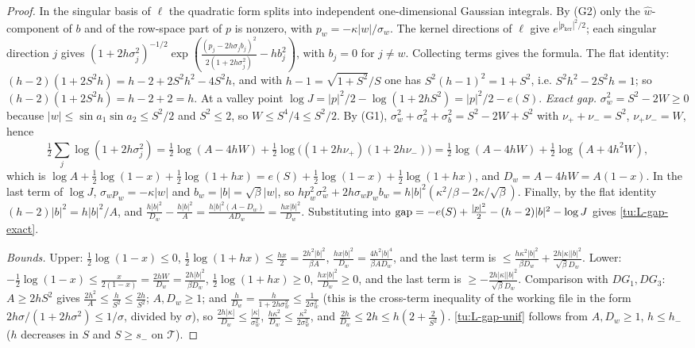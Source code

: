 \begin{proof}
In the singular basis of $\ell$ the quadratic form splits into independent one-dimensional Gaussian
integrals. By (G2) only the $\hat w$-component of $b$ and of the row-space part of $p$ is nonzero, with
$p_w=-\kappa|w|/\sigma_w$. The kernel directions of $\ell$ give $e^{|p_{\ker}|^2/2}$; each singular direction
$j$ gives $(1+2h\sigma_j^2)^{-1/2}\exp(\frac{(p_j-2h\sigma_jb_j)^2}{2(1+2h\sigma_j^2)}-hb_j^2)$, with $b_j=0$ for $j\ne w$.
Collecting terms gives the formula. The flat identity:
$(h-2)(1+2S^2h)=h-2+2S^2h^2-4S^2h$, and with $h-1=\sqrt{1+S^2}/S$ one has $S^2(h-1)^2=1+S^2$, i.e.
$S^2h^2-2S^2h=1$; so $(h-2)(1+2S^2h)=h-2+2=h$. At a valley point $\log J=|p|^2/2-\log(1+2hS^2)=|p|^2/2-e(S)$.
\emph{Exact gap.} $\sigma_w^2=S^2-2W\ge0$ because $|w|\le\sin a_1\sin a_2\le S^2/2$ and $S^2\le2$, so $W\le S^4/4\le S^2/2$.
By (G1), $\sigma_w^2+\sigma_a^2+\sigma_b^2=S^2-2W+S^2$ with $\nu_++\nu_-=S^2$, $\nu_+\nu_-=W$, hence
\[
\tfrac12\sum_j\log(1+2h\sigma_j^2)=\tfrac12\log(A-4hW)+\tfrac12\log\big((1+2h\nu_+)(1+2h\nu_-)\big)
=\tfrac12\log(A-4hW)+\tfrac12\log(A+4h^2W),
\]
which is $\log A+\frac12\log(1-x)+\frac12\log(1+hx)=e(S)+\frac12\log(1-x)+\frac12\log(1+hx)$, and $D_w=A-4hW=A(1-x)$.
In the last term of $\log J$, $\sigma_wp_w=-\kappa|w|$ and $b_w=|b|=\sqrt\beta|w|$, so
$h p_w^2\sigma_w^2+2h\sigma_wp_wb_w=h|b|^2(\kappa^2/\beta-2\kappa/\sqrt\beta)$. Finally, by the flat identity
$(h-2)|b|^2=h|b|^2/A$, and $\frac{h|b|^2}{D_w}-\frac{h|b|^2}A=\frac{h|b|^2(A-D_w)}{AD_w}=\frac{hx|b|^2}{D_w}$. Substituting into
${\rm gap}=-e(S)+\frac{|p|^2}2-(h-2)|b|^2-\log J$ gives \eqref{tu:L-gap-exact}.

\emph{Bounds.} Upper: $\frac12\log(1-x)\le0$, $\frac12\log(1+hx)\le\frac{hx}2=\frac{2h^2|b|^2}{\beta A}$,
$\frac{hx|b|^2}{D_w}=\frac{4h^2|b|^4}{\beta AD_w}$, and the last term is $\le\frac{h\kappa^2|b|^2}{\beta D_w}+\frac{2h|\kappa||b|^2}{\sqrt\beta D_w}$.
Lower: $-\frac12\log(1-x)\le\frac{x}{2(1-x)}=\frac{2hW}{D_w}=\frac{2h|b|^2}{\beta D_w}$, $\frac12\log(1+hx)\ge0$, $\frac{hx|b|^2}{D_w}\ge0$,
and the last term is $\ge-\frac{2h|\kappa||b|^2}{\sqrt\beta D_w}$. Comparison with $DG_1,DG_3$: $A\ge2hS^2$ gives
$\frac{2h^2}{A}\le\frac{h}{S^2}\le\frac{2h}{S^2}$; $A,D_w\ge1$; and $\frac h{D_w}=\frac{h}{1+2h\sigma_w^2}\le\frac1{2\sigma_w^2}$ (this is the cross-term
inequality of the working file in the form $2h\sigma/(1+2h\sigma^2)\le1/\sigma$, divided by $\sigma$), so
$\frac{2h|\kappa|}{D_w}\le\frac{|\kappa|}{\sigma_w^2}$, $\frac{h\kappa^2}{D_w}\le\frac{\kappa^2}{2\sigma_w^2}$, and $\frac{2h}{D_w}\le2h\le h(2+\frac2{S^2})$.
\eqref{tu:L-gap-unif} follows from $A,D_w\ge1$, $h\le h_-$ ($h$ decreases in $S$ and $S\ge s_-$ on $\mathcal T$).
\end{proof}

